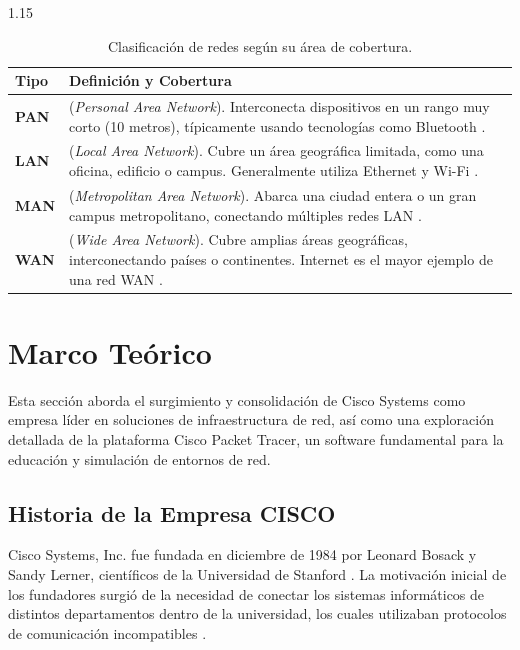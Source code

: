 \documentclass[11pt, a4paper]{article}
\begin{document}
\begin{spacing}{1.15}
\begin{table}[H]
    \centering
    \renewcommand{\arraystretch}{1.35}
    \begin{tabular}{|p{2cm}|p{12.5cm}|}
        \hline
        \textbf{Tipo} & \textbf{Definición y Cobertura} \\ \hline
        \textbf{PAN} & (\textit{Personal Area Network}). Interconecta dispositivos en un rango muy corto (10 metros), típicamente usando tecnologías como Bluetooth \cite{forouzan2013}. \\ \hline
        \textbf{LAN} & (\textit{Local Area Network}). Cubre un área geográfica limitada, como una oficina, edificio o campus. Generalmente utiliza Ethernet y Wi-Fi \cite{tanenbaum2021}. \\ \hline
        \textbf{MAN} & (\textit{Metropolitan Area Network}). Abarca una ciudad entera o un gran campus metropolitano, conectando múltiples redes LAN \cite{stallings2014}. \\ \hline
        \textbf{WAN} & (\textit{Wide Area Network}). Cubre amplias áreas geográficas, interconectando países o continentes. Internet es el mayor ejemplo de una red WAN \cite{kurose2017}. \\ \hline
    \end{tabular}
    \caption{Clasificación de redes según su área de cobertura.}
\end{table}

\newpage

\section{Marco Teórico}
Esta sección aborda el surgimiento y consolidación de Cisco Systems como empresa líder en soluciones de infraestructura de red, así como una exploración detallada de la plataforma Cisco Packet Tracer, un software fundamental para la educación y simulación de entornos de red.

\subsection{Historia de la Empresa CISCO}
Cisco Systems, Inc. fue fundada en diciembre de 1984 por Leonard Bosack y Sandy Lerner, científicos de la Universidad de Stanford \cite{cisco_history}. La motivación inicial de los fundadores surgió de la necesidad de conectar los sistemas informáticos de distintos departamentos dentro de la universidad, los cuales utilizaban protocolos de comunicación incompatibles \cite{cisco_tech}.


\end{spacing}
\end{document}
